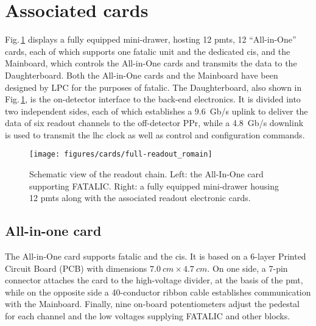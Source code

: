 \section{Associated cards}
\label{sec:cards}

Fig.\,\ref{fig:cards:overview} displays a fully equipped mini-drawer, hosting 12 \glspl{pmt}, 12 ``All-in-One'' cards, each of 
which supports one \gls{fatalic} unit and the dedicated \gls{cis}, and the Mainboard, which controls the All-in-One cards and 
transmits the data to the Daughterboard. Both the All-in-One cards and the Mainboard have been designed by LPC for the purposes 
of \gls{fatalic}. The Daughterboard, also shown in Fig.\,\ref{fig:cards:overview}, is the on-detector interface to the back-end 
electronics. It is divided into two independent sides, each of which establishes a \SI{9.6}{Gb/s} uplink to deliver the data of 
six readout channels to the off-detector PPr, while a \SI{4.8}{Gb/s} downlink is used to transmit the \gls{lhc} clock as well as 
control and configuration commands.

\begin{figure}[t]
  \begin{center}
    \texttt{[image: figures/cards/full-readout\_romain]}
    \caption{Schematic view of the readout chain. Left: the All-In-One card supporting FATALIC. Right: a 
    fully equipped mini-drawer housing 12 \glspl{pmt} along with the associated readout electronic cards.
    \label{fig:cards:overview}}
  \end{center}
\end{figure}

\subsection{All-in-one card}

The All-in-One card supports \gls{fatalic} and the \gls{cis}. It is based on a 6-layer Printed Circuit Board (PCB)
with dimensions $\SI{7.0}{cm}\times\SI{4.7}{cm}$. On one side, a 7-pin connector attaches the card to the 
high-voltage divider, at the basis of the \gls{pmt}, while on the opposite side a 40-conductor ribbon cable establishes 
communication with the Mainboard. Finally, nine on-board potentiometers adjust the pedestal for each channel and the low
voltages supplying FATALIC and other blocks.

